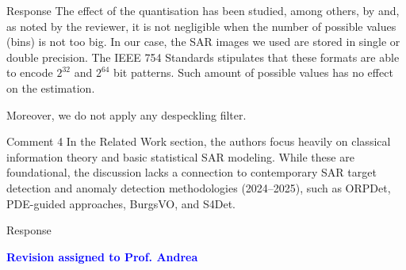 \documentclass[11pt]{report}
\newcommand{\assigned}[1]{\textcolor{blue}{\textbf{#1}}}
\begin{document}
\begin{responsebox}{Response}
The effect of the quantisation has been studied, among others, by \citet{beirlant1997nonparametric} and, as noted by the reviewer, it is not negligible when the number of possible values (bins) is not too big.
In our case, the SAR images we used are stored in single or double precision.
The IEEE 754 Standards stipulates that these formats are able to encode $2^{32}$ and $2^{64}$ bit patterns.
Such amount of possible values has no effect on the estimation.

Moreover, we do not apply any despeckling filter.

\end{responsebox}

\vspace{1em}

\begin{reviewbox}{Comment 4}
In the Related Work section, the authors focus heavily on classical information theory and basic statistical SAR modeling. While these are foundational, the discussion lacks a connection to contemporary SAR target detection and anomaly detection methodologies (2024--2025), such as ORPDet, PDE-guided approaches, BurgsVO, and S4Det.
\end{reviewbox}

\begin{responsebox}{Response}

\assigned{Revision assigned to Prof. Andrea}

\end{responsebox}




\end{document}
